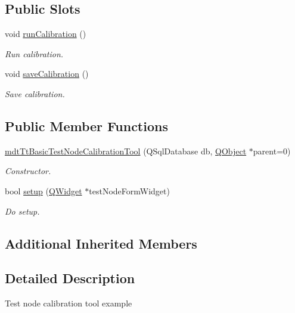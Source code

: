 \subsection*{Public Slots}
\begin{DoxyCompactItemize}
\item 
void \hyperlink{classmdt_tt_basic_test_node_calibration_tool_a0a524857582a178cbea54775cf526985}{run\-Calibration} ()
\begin{DoxyCompactList}\small\item\em Run calibration. \end{DoxyCompactList}\item 
void \hyperlink{classmdt_tt_basic_test_node_calibration_tool_a4582f51483a24b71231c47819dd96229}{save\-Calibration} ()
\begin{DoxyCompactList}\small\item\em Save calibration. \end{DoxyCompactList}\end{DoxyCompactItemize}
\subsection*{Public Member Functions}
\begin{DoxyCompactItemize}
\item 
\hyperlink{classmdt_tt_basic_test_node_calibration_tool_aeddd296806f3e2b7ea99ba220171a3c6}{mdt\-Tt\-Basic\-Test\-Node\-Calibration\-Tool} (Q\-Sql\-Database db, \hyperlink{class_q_object}{Q\-Object} $\ast$parent=0)
\begin{DoxyCompactList}\small\item\em Constructor. \end{DoxyCompactList}\item 
bool \hyperlink{classmdt_tt_basic_test_node_calibration_tool_a471178c597a57866a6cefe86c4fba19e}{setup} (\hyperlink{class_q_widget}{Q\-Widget} $\ast$test\-Node\-Form\-Widget)
\begin{DoxyCompactList}\small\item\em Do setup. \end{DoxyCompactList}\end{DoxyCompactItemize}
\subsection*{Additional Inherited Members}


\subsection{Detailed Description}
Test node calibration tool example 

